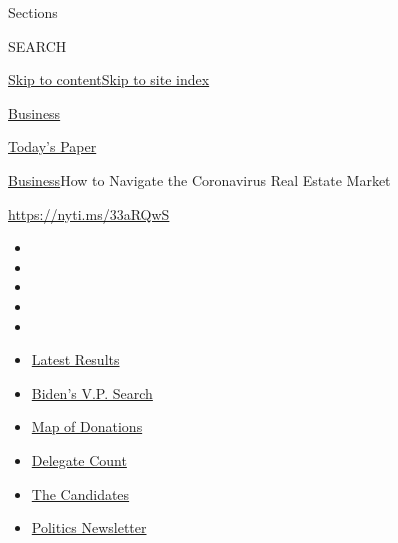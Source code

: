 Sections

SEARCH

\protect\hyperlink{site-content}{Skip to
content}\protect\hyperlink{site-index}{Skip to site index}

\href{https://www.nytimes.com/section/business}{Business}

\href{https://myaccount.nytimes.com/auth/login?response_type=cookie\&client_id=vi}{}

\href{https://www.nytimes.com/section/todayspaper}{Today's Paper}

\href{/section/business}{Business}\textbar{}How to Navigate the
Coronavirus Real Estate Market

\url{https://nyti.ms/33aRQwS}

\begin{itemize}
\item
\item
\item
\item
\item
\end{itemize}

\begin{itemize}
\item
  \href{https://www.nytimes.com/interactive/2020/08/04/us/elections/results-arizona-kansas-michigan-missouri-primaries.html?action=click\&pgtype=Article\&state=default\&region=TOP_BANNER\&context=storylines_menu}{Latest
  Results}
\item
  \href{https://www.nytimes.com/article/biden-vice-president-2020.html?action=click\&pgtype=Article\&state=default\&region=TOP_BANNER\&context=storylines_menu}{Biden's
  V.P. Search}
\item
  \href{https://www.nytimes.com/interactive/2020/07/24/us/politics/trump-biden-campaign-donors.html?action=click\&pgtype=Article\&state=default\&region=TOP_BANNER\&context=storylines_menu}{Map
  of Donations}
\item
  \href{https://www.nytimes.com/interactive/2020/us/elections/delegate-count-primary-results.html?action=click\&pgtype=Article\&state=default\&region=TOP_BANNER\&context=storylines_menu}{Delegate
  Count}
\item
  \href{https://www.nytimes.com/interactive/2019/us/politics/2020-presidential-candidates.html?action=click\&pgtype=Article\&state=default\&region=TOP_BANNER\&context=storylines_menu}{The
  Candidates}
\item
  \href{https://www.nytimes.com/newsletters/politics?action=click\&pgtype=Article\&state=default\&region=TOP_BANNER\&context=storylines_menu}{Politics
  Newsletter}
\end{itemize}

